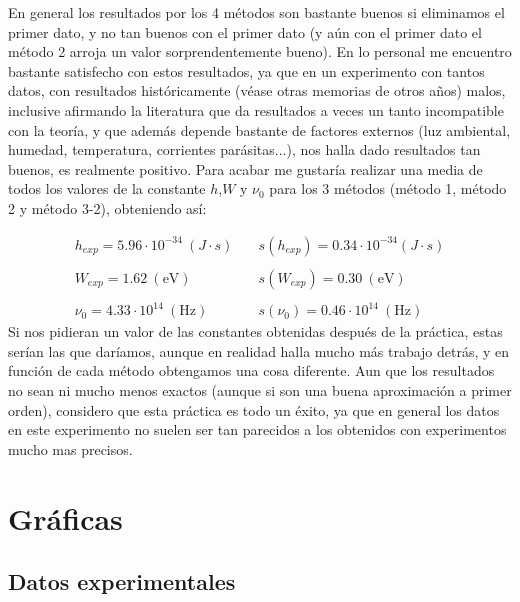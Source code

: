 \documentclass[12pt,a4paper]{article}
\numberwithin{equation}{section}
\numberwithin{table}{section}
\numberwithin{figure}{section}
\begin{document}
En general los resultados por los 4 métodos son bastante buenos si eliminamos el primer dato, y no tan buenos con el primer dato (y aún con el primer dato el método 2 arroja un valor sorprendentemente bueno). En lo personal me encuentro bastante satisfecho con estos resultados, ya que en un experimento con tantos datos, con resultados históricamente (véase otras memorias de otros años) malos, inclusive afirmando la literatura que da resultados a veces un tanto incompatible con la  teoría, y que además depende bastante de factores externos (luz ambiental, humedad, temperatura, corrientes parásitas...), nos halla dado resultados tan buenos, es realmente positivo. Para acabar me gustaría realizar una media de todos los valores de la constante $h$,$W$ y $\nu_0$ para los 3 métodos (método 1, método 2 y método 3-2), obteniendo así:

\begin{equation}
\begin{array}{ll}
h_{exp} = 5.96 \cdot 10^{-34} \ (J \cdot s) & \quad s(h_{exp}) = 0.34 \cdot 10^{-34}  (J \cdot s)  \\ \\

 W_{exp} = 1.62 \ (\mathrm{eV}) & \quad  s(W_{exp}) =  0.30 \ (\mathrm{eV}) \\ \\
 
 \nu_0 = 4.33 \cdot 10^{14} \ (\mathrm{Hz}) & \quad s(\nu_0) = 0.46 \cdot 10^{14} \ (\mathrm{Hz})
\end{array}
\end{equation}
Si nos pidieran un valor de las constantes obtenidas después de la práctica, estas serían las que daríamos, aunque en realidad halla mucho más trabajo detrás, y en función de cada método obtengamos una cosa diferente. Aun que los resultados no sean ni mucho menos exactos (aunque si son una buena aproximación a primer orden), considero que esta práctica es todo un éxito, ya que en general los datos en este experimento no suelen ser tan parecidos a los obtenidos con experimentos mucho mas precisos. 

\newpage

\section{Gráficas} \label{Sec:6-graficas}

\subsection{Datos experimentales}
\end{document}
